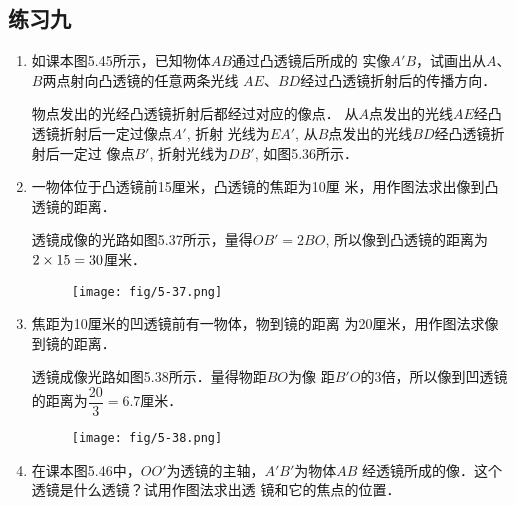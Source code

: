 \subsection{练习九}
\begin{enumerate}
    \item 如课本图5.45所示，已知物体$AB$通过凸透镜后所成的
    实像$A'B$，试画出从$A$、$B$两点射向凸透镜的任意两条光线
    $AE$、$BD$经过凸透镜折射后的传播方向．
    \begin{figure}[htp]\centering
{}
        \caption{}
        \end{figure}


    \begin{solution}
物点发出的光经凸透镜折射后都经过对应的像点．
从$A$点发出的光线$AE$经凸透镜折射后一定过像点$A'$, 折射
光线为$EA'$, 从$B$点发出的光线$BD$经凸透镜折射后一定过
像点$B'$, 折射光线为$DB'$, 如图5.36所示．
    \end{solution}
    \item 一物体位于凸透镜前15厘米，凸透镜的焦距为10厘
米，用作图法求出像到凸透镜的距离．

\begin{solution}
    透镜成像的光路如图5.37所示，量得$OB'=2BO$, 
    所以像到凸透镜的距离为$2\times15=30$厘米．
    \begin{figure}[htp]
        \centering
        \texttt{[image: fig/5-37.png]}
        \caption{}
    \end{figure}
\end{solution}
\item 焦距为10厘米的凹透镜前有一物体，物到镜的距离
为20厘米，用作图法求像到镜的距离．

\begin{solution}
    透镜成像光路如图5.38所示．量得物距$BO$为像
    距$B'O$的3倍，所以像到凹透镜的距离为$\dfrac{20}{3}=6.7$厘米．
    \begin{figure}[htp]
        \centering
        \texttt{[image: fig/5-38.png]}
        \caption{}
    \end{figure}
\end{solution}
\item 在课本图5.46中，$OO'$为透镜的主轴，$A'B'$为物体$AB$
经透镜所成的像．这个透镜是什么透镜？试用作图法求出透
镜和它的焦点的位置．                    


\end{enumerate}
